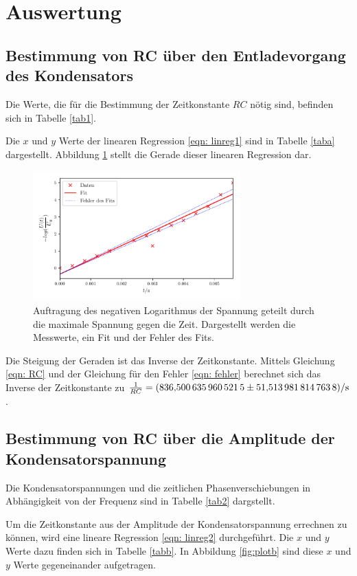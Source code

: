 \section{Auswertung}
\label{sec:Auswertung}


\subsection{Bestimmung von RC über den Entladevorgang des Kondensators}
\label{sec: a}
Die Werte, die für die Bestimmung der Zeitkonstante $RC$ nötig sind, befinden sich in Tabelle \ref{tab1}. %

Die $x$ und $y$ Werte der linearen Regression \eqref{eqn: linreg1} sind in Tabelle \ref{taba} dargestellt.
Abbildung \ref{fig:plota} stellt die Gerade dieser linearen Regression dar.


\begin{figure}
  \centering
  \includegraphics[width=8cm, height=5cm]{build/plota.pdf}
  \caption{Auftragung des negativen Logarithmus der Spannung geteilt durch die maximale Spannung gegen die Zeit.
  Dargestellt werden die Messwerte, ein Fit und der Fehler des Fits.} %
  \label{fig:plota}
\end{figure}

\noindent Die Steigung der Geraden ist das Inverse der Zeitkonstante.
Mittels Gleichung \eqref{eqn: RC} und der Gleichung für den Fehler \eqref{eqn: fehler} berechnet
sich das Inverse der Zeitkonstante zu $\frac{1}{RC} = \SI{836.5006359605215 \pm 51.5139818147638}{\per\second}$.

\subsection{Bestimmung von RC über die Amplitude der Kondensatorspannung}
\label{sec: b}
Die Kondensatorspannungen und die zeitlichen Phasenverschiebungen in Abhängigkeit
von der Frequenz sind in Tabelle \ref{tab2} dargstellt.

Um die Zeitkonstante aus der Amplitude der Kondensatorspannung errechnen zu können, wird eine lineare Regression 
\eqref{eqn: linreg2} durchgeführt. Die $x$ und $y$ Werte dazu finden sich in Tabelle \ref{tabb}.
In Abbildung \ref{fig:plotb} sind diese $x$ und $y$ Werte gegeneinander aufgetragen.


